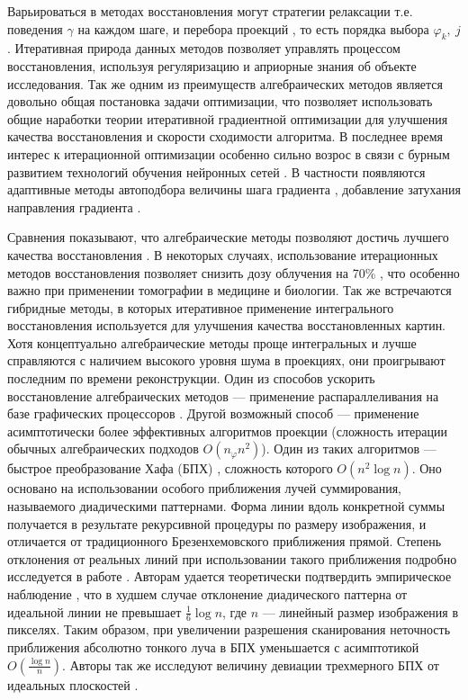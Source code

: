 Варьироваться в методах восстановления могут стратегии релаксации \cite{art_regparam} т.е. поведения $\gamma$ на каждом шаге, и перебора проекций \cite{art_pointschoice}, то есть порядка выбора $\varphi_k,\ j$.
Итеративная природа данных методов позволяет управлять процессом восстановления, используя регуляризацию и априорные знания об объекте исследования.
Так же одним из преимуществ алгебраических методов является довольно общая постановка задачи оптимизации, что позволяет использовать общие наработки теории итеративной градиентной оптимизации для улучшения качества восстановления и скорости сходимости алгоритма.
В последнее время  интерес к итерационной оптимизации особенно сильно возрос в связи с бурным развитием технологий обучения нейронных сетей \cite{battiti1992first, le2011optimization}.
В частности появляются адаптивные методы автоподбора величины шага градиента \cite{kingma2014adam, duchi2011adaptive, zeiler2012adadelta}, добавление затухания направления градиента \cite{qian1999momentum, nesterov1983method}.

Сравнения показывают, что алгебраические методы позволяют достичь лучшего качества восстановления \cite{sirt_less_artifacts, Lucas_sota_ir_survey_2015_radiology}.
В некоторых случаях, использование итерационных методов восстановления позволяет снизить дозу облучения на 70\% \cite{Willemink2013}, что особенно важно при применении томографии в медицине и биологии.
Так же встречаются гибридные методы, в которых итеративное применение интегрального восстановления используется для улучшения качества восстановленных картин.
Хотя концептуально алгебраические методы проще интегральных и лучше справляются с наличием высокого уровня шума в проекциях, они проигрывают последним по времени реконструкции.
Один из способов ускорить восстановление алгебраических методов --- применение распараллеливания на базе графических процессоров \cite{buz2011cuda}.
Другой возможный способ --- применение асимптотически более эффективных алгоритмов проекции (сложность итерации обычных алгебраических подходов $O(n_\varphi n^2)$).
Один из таких алгоритмов --- быстрое преобразование Хафа (БПХ) \cite{Brady1998, brady1992fast, hough}, сложность которого $O(n^2 \log n)$.
Оно основано на использовании особого приближения лучей суммирования, называемого диадическими паттернами.
Форма линии вдоль конкретной суммы получается в результате рекурсивной процедуры по размеру изображения, и отличается от традиционного Брезенхемовского приближения прямой.
Степень отклонения от реальных линий при использовании такого приближения подробно исследуется в работе \cite{ershov2015dyadic}.
Авторам удается теоретически подтвердить эмпирическое наблюдение \cite{Brady1998}, что в худшем случае отклонение диадического паттерна от идеальной линии не превышает $\frac 1 6 \log n$, где $n$ --- линейный размер изображения в пикселях.
Таким образом, при увеличении разрешения сканирования неточность приближения абсолютно тонкого луча в БПХ уменьшается с асимптотикой $O\left(\frac {\log n}{n}\right)$.
Авторы так же исследуют величину девиации трехмерного БПХ от идеальных плоскостей \cite{ershov3DHough}.

